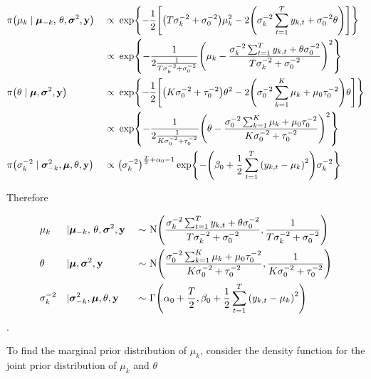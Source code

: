 \documentclass[11pt]{article} %
\let\originalleft\left
\let\originalright\right
\renewcommand{\left}{\mathopen{}\mathclose\bgroup\originalleft}
\renewcommand{\right}{\aftergroup\egroup\originalright}
\begin{document}
 \begin{alignat*}{2}
 	& \pi\left(\mu_k \mid \boldsymbol{\mu}_{-k},\, \theta, \boldsymbol{\sigma}^{2}, \mathbf{y}\right) &\ \propto\ & \exp\left\{-\frac{1}{2}\left[\left(T\sigma_k^{-2}+\sigma_0^{-2}\right)\mu_k^2 - 2\left(\sigma_k^{-2}\sum_{t=1}^{T}{y_{k, t}}+\sigma_0^{-2}\theta\right) \right]\right\} \\
 	& &\ \propto\ & \exp\left\{-\frac{1}{2\frac{1}{T\sigma_k^{-2}+\sigma_0^{-2}}}\left(\mu_k-\frac{\sigma_k^{-2}\sum_{t=1}^{T}{y_{k, t}}+\theta\sigma_0^{-2}}{T\sigma_k^{-2}+\sigma_0^{-2}}\right)^2\right\} \\
 	& \pi\left(\theta \mid \boldsymbol{\mu}, \boldsymbol{\sigma}^{2}, \mathbf{y}\right) &\ \propto\ & \exp\left\{-\frac{1}{2}\left[\left(K\sigma_0^{-2}+\tau_0^{-2}\right)\theta^2 - 2\left(\sigma_0^{-2}\sum_{k=1}^{K}{\mu_k}+\mu_0\tau_0^{-2}\right)\theta \right]\right\} \\
 	& &\ \propto\ & \exp\left\{-\frac{1}{2\frac{1}{K\sigma_0^{-2}+\tau_0^{-2}}}\left(\theta-\frac{\sigma_0^{-2}\sum_{k=1}^{K}{\mu_k}+\mu_0\tau_0^{-2}}{K\sigma_0^{-2}+\tau_0^{-2}}\right)^2\right\} \\
 	& \pi\left(\sigma_k^{-2} \mid \boldsymbol{\sigma}_{-k}^2, \boldsymbol{\mu}, \theta, \mathbf{y}\right) &\ \propto\ & \left(\sigma_k^{-2}\right)^{\frac{T}{2} + \alpha_0 -1}\exp\left\{-\left(\beta_0 + \frac{1}{2}\sum_{t=1}^{T}{\left(y_{k, t} - \mu_k\right)^2}\right)\sigma_k^{-2}\right\}
\end{alignat*}

Therefore

\begin{alignat*}{3}
	& \mu_k &\mid& \boldsymbol{\mu}_{-k},\, \theta, \boldsymbol{\sigma}^{2}, \mathbf{y} &\ \sim\ & \mbox{N}\left(\frac{\sigma_k^{-2}\sum_{t=1}^{T}{y_{k, t}}+\theta\sigma_0^{-2}}{T\sigma_k^{-2}+\sigma_0^{-2}}, \frac{1}{T\sigma_k^{-2}+\sigma_0^{-2}}\right) \\
	& \theta &\mid& \boldsymbol{\mu}, \boldsymbol{\sigma}^{2}, \mathbf{y} &\ \sim\ & \mbox{N}\left(\frac{\sigma_0^{-2}\sum_{k=1}^{K}{\mu_k}+\mu_0\tau_0^{-2}}{K\sigma_0^{-2}+\tau_0^{-2}}, \frac{1}{K\sigma_0^{-2}+\tau_0^{-2}}\right) \\
	& \sigma_k^{-2} &\mid& \boldsymbol{\sigma}_{-k}^2, \boldsymbol{\mu}, \theta, \mathbf{y} &\ \sim\ & \Gamma\left(\alpha_0 + \frac{T}{2}, \beta_0 + \frac{1}{2}\sum_{t=1}^{T}{\left(y_{k, t} - \mu_k\right)^2}\right)
\end{alignat*}.

To find the marginal prior distribution of  $\mu_k$, consider the density function for the joint prior distribution of $\mu_k$ and $\theta$
\end{document}
